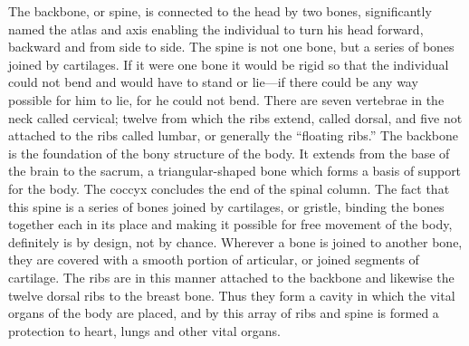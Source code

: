 The backbone, or spine, is connected to the head by two bones, significantly named the atlas
and axis enabling the individual to turn his head forward, backward and from side to side.
The spine is not one bone, but a series of bones joined by cartilages. If it were one bone it
would be rigid so that the individual could not bend and would have to stand or lie—if there
could be any way possible for him to lie, for he could not bend. There are seven vertebrae in
the neck called cervical; twelve from which the ribs extend, called dorsal, and five not
attached to the ribs called lumbar, or generally the ``floating ribs.'' The backbone is the
foundation of the bony structure of the body. It extends from the base of the brain to the
sacrum, a triangular-shaped bone which forms a basis of support for the body. The coccyx
concludes the end of the spinal column. The fact that this spine is a series of bones joined by
cartilages, or gristle, binding the bones together each in its place and making it possible for
free movement of the body, definitely is by design, not by chance. Wherever a bone is joined
to another bone, they are covered with a smooth portion of articular, or joined segments of
cartilage. The ribs are in this manner attached to the backbone and likewise the twelve dorsal
ribs to the breast bone. Thus they form a cavity in which the vital organs of the body are
placed, and by this array of ribs and spine is formed a protection to heart, lungs and other
vital organs.

